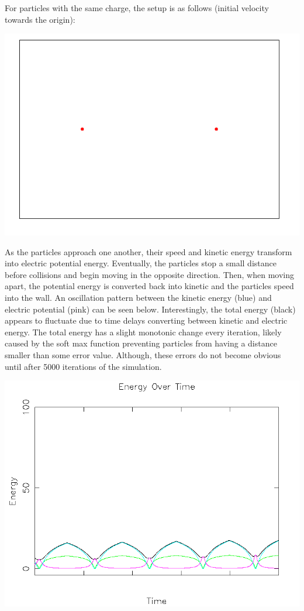 \documentclass{article}
\begin{document}
For particles with the same charge, the setup is as follows (initial velocity towards the origin):
\\
\begin{center}
    \includegraphics[scale=0.5]{charged_2_same}
\end{center}

As the particles approach one another, their speed and kinetic energy transform into electric potential energy.
Eventually, the particles stop a small distance before collisions and begin moving in the opposite direction.
Then, when moving apart, the potential energy is converted back into kinetic and the particles speed into the wall.
An oscillation pattern between the kinetic energy (blue) and electric potential (pink) can be seen below.
Interestingly, the total energy (black) appears to fluctuate due to time delays
converting between kinetic and electric energy.
The total energy has a slight monotonic change every iteration,
likely caused by the soft max function preventing particles from having
a distance smaller than some error value.
Although, these errors do not become obvious until after 5000 iterations of the simulation.
\\
\begin{center}
    \includegraphics[scale=0.5]{charged_2_same_energy}
\end{center}
\end{document}
